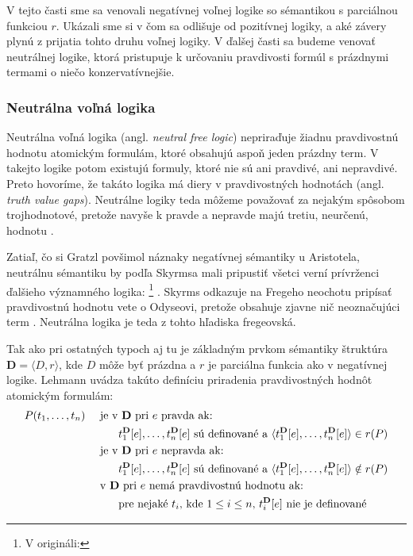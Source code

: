 \documentclass[12pt, letterpaper]{article}
\begin{document}
V tejto časti sme sa venovali negatívnej voľnej logike so sémantikou s parciálnou funkciou $r$. Ukázali sme si v čom sa odlišuje od pozitívnej logiky, a aké závery plynú z prijatia tohto druhu voľnej logiky. V ďalšej časti sa budeme venovať neutrálnej logike, ktorá pristupuje k určovaniu pravdivosti formúl s prázdnymi termami o niečo konzervatívnejšie.

\subsubsection{Neutrálna voľná logika}
Neutrálna voľná logika (angl. \textit{neutral free logic}) nepriraďuje žiadnu pravdivostnú hodnotu atomickým formulám, ktoré obsahujú aspoň jeden prázdny term. V takejto logike potom existujú formuly, ktoré nie sú ani pravdivé, ani nepravdivé. Preto hovoríme, že takáto logika má diery v pravdivostných hodnotách (angl. \textit{truth value gaps}). Neutrálne logiky teda môžeme považovať za nejakým spôsobom trojhodnotové, pretože navyše k pravde a nepravde majú tretiu, neurčenú,  hodnotu \parencites[155]{Dumitru2015}{sep-logic-free}[519]{Pavlovic2023}[295, 465]{Priest_2008}.\par 
Zatiaľ, čo si Gratzl povšimol náznaky negatívnej sémantiky u Aristotela, neutrálnu sémantiku by podľa Skyrmsa mali pripustiť všetci verní prívrženci ďalšieho významného logika: \footnote{V origináli: } \parencites[vlastný preklad,][479]{Skyrms}. Skyrms odkazuje na Fregeho neochotu pripísať pravdivostnú hodnotu vete o Odyseovi, pretože obsahuje zjavne nič neoznačujúci term \parencites[24]{frege1903}[307]{SFFL}. Neutrálna logika je teda z tohto hľadiska fregeovská.\par
Tak ako pri ostatných typoch aj tu je základným prvkom sémantiky štruktúra $\textbf{D} = \langle D, r \rangle$, kde $D$ môže byť prázdna a $r$ je parciálna funkcia ako v negatívnej logike. Lehmann uvádza takúto definíciu priradenia pravdivostných hodnôt atomickým formulám:  
\begin{alignat}{2} 
    & P(t_1,\dots, t_n) && \text{ je v \textbf{D} pri $e$ pravda ak: } \nonumber \\ 
    && & \qquad t_{1}^{\mathbf{D}}[e],\dots, t_{n}^{\mathbf{D}}[e] \text{ sú definované a } \langle t_{1}^{\mathbf{D}}[e],\dots, t_{n}^{\mathbf{D}}[e]\rangle \in r(P)  \nonumber \\ 
    && & \text{ je v \textbf{D} pri $e$ nepravda ak: } \nonumber \\
    && & \qquad t_{1}^{\mathbf{D}}[e],\dots, t_{n}^{\mathbf{D}}[e] \text{ sú definované a } \langle t_{1}^{\mathbf{D}}[e],\dots, t_{n}^{\mathbf{D}}[e]\rangle \notin r(P) \nonumber \\
    && & \text{ v \textbf{D} pri $e$ nemá pravdivostnú hodnotu ak: } \nonumber \\
    && & \qquad\text{pre nejaké } t_{i} \text{, kde } 1 \leq i \leq n \text{, } t_{i}^{\mathbf{D}}[e] \text{ nie je definované} \label{NFatomic}
\end{alignat}
\end{document}
